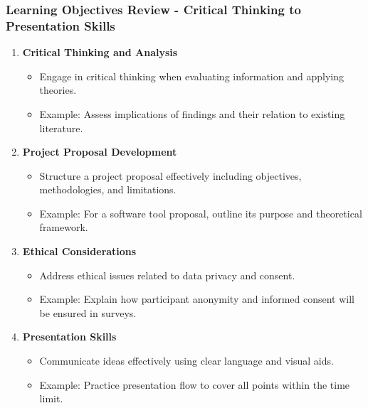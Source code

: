 \documentclass[aspectratio=169]{beamer}
\begin{document}
\begin{frame}[fragile]
    \frametitle{Learning Objectives Review - Critical Thinking to Presentation Skills}
    \begin{enumerate}[resume]
        \item \textbf{Critical Thinking and Analysis}
            \begin{itemize}
                \item Engage in critical thinking when evaluating information and applying theories.
                \item Example: Assess implications of findings and their relation to existing literature.
            \end{itemize}

        \item \textbf{Project Proposal Development}
            \begin{itemize}
                \item Structure a project proposal effectively including objectives, methodologies, and limitations.
                \item Example: For a software tool proposal, outline its purpose and theoretical framework.
            \end{itemize}

        \item \textbf{Ethical Considerations}
            \begin{itemize}
                \item Address ethical issues related to data privacy and consent.
                \item Example: Explain how participant anonymity and informed consent will be ensured in surveys.
            \end{itemize}

        \item \textbf{Presentation Skills}
            \begin{itemize}
                \item Communicate ideas effectively using clear language and visual aids.
                \item Example: Practice presentation flow to cover all points within the time limit.
            \end{itemize}
    \end{enumerate}
\end{frame}
\end{document}

